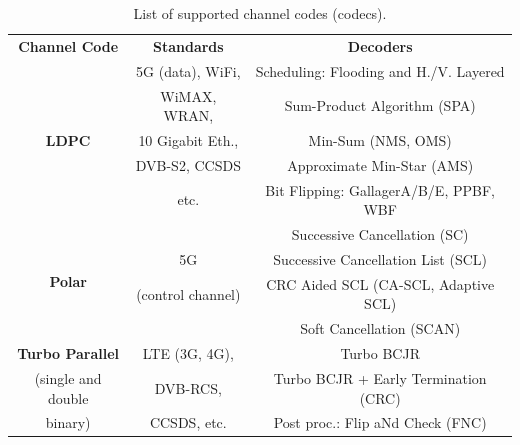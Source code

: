 \begin{table}
  \centering
  \caption{List of supported channel codes (codecs).}
  \label{tab:lib_codecs}
  \begin{tabular}{ c | c | c }
  \multirow{2}{*}{\textbf{Channel Code}}   & \multirow{2}{*}{\textbf{Standards}} & \multirow{2}{*}{\textbf{Decoders}}     \\
                                           &                                     &                                        \\
  \hline
  \hline
  \multirow{5}{*}{\textbf{LDPC}}           & 5G (data), WiFi,                    & Scheduling: Flooding and H./V. Layered \\
                                           & WiMAX, WRAN,                        & Sum-Product Algorithm (SPA)            \\
                                           & 10 Gigabit Eth.,                    & Min-Sum (NMS, OMS)                     \\
                                           & DVB-S2, CCSDS                       & Approximate Min-Star (AMS)             \\
                                           & etc.                                & Bit Flipping: GallagerA/B/E, PPBF, WBF \\
  \hline
  \multirow{4}{*}{\textbf{Polar}}          &                                     & Successive Cancellation (SC)           \\
                                           & 5G                                  & Successive Cancellation List (SCL)     \\
                                           & (control channel)                   & CRC Aided SCL (CA-SCL, Adaptive SCL)   \\
                                           &                                     & Soft Cancellation (SCAN)               \\
  \hline
  \multirow{1}{*}{\textbf{Turbo Parallel}} & LTE (3G, 4G),                       & Turbo BCJR                             \\
  (single and double                       & DVB-RCS,                            & Turbo BCJR + Early Termination (CRC)   \\
  binary)                                  & CCSDS, etc.                         & Post proc.: Flip aNd Check (FNC)       \\

\end{tabular}
\end{table}
